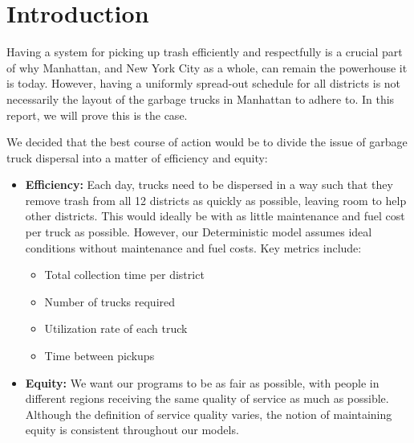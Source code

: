 \documentclass{article}
\begin{document}
\tableofcontents

\newpage



\section{Introduction}

Having a system for picking up trash efficiently and respectfully is a crucial part of why Manhattan, and New York City as a whole, can remain the powerhouse it is today. However, having a uniformly spread-out schedule for all districts is not necessarily the layout of the garbage trucks in Manhattan to adhere to. In this report, we will prove this is the case.

We decided that the best course of action would be to divide the issue of garbage truck dispersal into a matter of efficiency and equity:

\begin{itemize}
    \item \textbf{Efficiency:} Each day, trucks need to be dispersed in a way such that they remove trash from all 12 districts as quickly as possible, leaving room to help other districts. This would ideally be with as little maintenance and fuel cost per truck as possible. However, our Deterministic model assumes ideal conditions without maintenance and fuel costs. Key metrics include:
    \begin{itemize}
        \item Total collection time per district
        \item Number of trucks required
        \item Utilization rate of each truck
        \item Time between pickups
    \end{itemize}
    
    \item \textbf{Equity:} We want our programs to be as fair as possible, with people in different regions receiving the same quality of service as much as possible. Although the definition of service quality varies, the notion of maintaining equity is consistent throughout our models.
\end{itemize}


    
\end{document}
